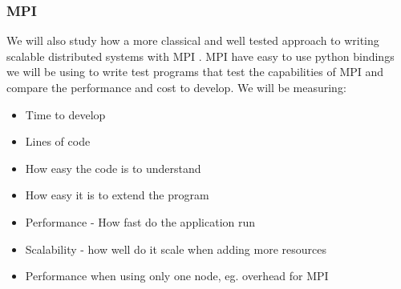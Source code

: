 \documentclass{article}
\begin{document}
\subsubsection{MPI}
We will also study how a more classical and well tested approach to writing
scalable distributed systems with MPI \cite{gropp1996high}. MPI have easy
to use python bindings \cite{miller2002pympi} \cite{millerparallel} we will be
using to write test programs that test the capabilities of MPI and compare the
performance and cost to develop.
We will be measuring:
\begin{itemize}
\item Time to develop
\item Lines of code
\item How easy the code is to understand
\item How easy it is to extend the program
\item Performance - How fast do the application run
\item Scalability - how well do it scale when adding more resources
\item Performance when using only one node, eg. overhead for MPI
\end{itemize}
 




\end{document}
